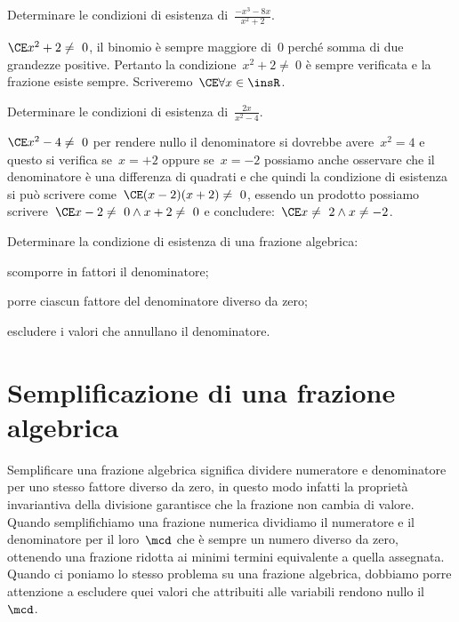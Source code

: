  \begin{esempio}
Determinare le condizioni di esistenza di~\(\frac{-x^{3}-8x}{x^{2}+2}\).

\(\CE x^{2}+2\neq~0\), il binomio è sempre maggiore di~\(0\) perché somma di due 
grandezze positive.
Pertanto la condizione~\(x^{2}+2\neq~0\) è sempre verificata e la frazione 
esiste sempre. Scriveremo~\(\CE \forall x\in \insR\).
 \end{esempio}

 \begin{esempio}
Determinare le condizioni di esistenza di~\(\frac{2x}{x^{2}-4}\).

\(\CE x^{2}-4\neq~0\) per rendere nullo il denominatore si dovrebbe 
avere~\(x^2 = 4\) e questo si verifica se~\(x = +2\)
oppure se~\(x = -2\) possiamo anche osservare che il denominatore è una 
differenza di quadrati e che quindi la
condizione di esistenza si può scrivere come~\(\CE (x-2)(x+2)\neq~0\), essendo 
un prodotto possiamo
scrivere~\(\CE x-2\neq~0\wedge x+2\neq~0\) e 
concludere:~\(\CE x\neq~2\wedge x\neq -2\).
 \end{esempio}

\begin{procedura}
Determinare la condizione di esistenza di una frazione algebrica:
\begin{enumeratea}
\item scomporre in fattori il denominatore;
\item porre ciascun fattore del denominatore diverso da zero;
\item escludere i valori che annullano il denominatore.
\end{enumeratea}
\end{procedura}


\section{Semplificazione di una frazione algebrica}
\label{sec:frazalg_semplificazione}

Semplificare una frazione algebrica significa dividere numeratore e 
denominatore per uno stesso fattore diverso da zero, in questo modo infatti la 
proprietà invariantiva della divisione garantisce che la frazione non cambia 
di valore.
Quando semplifichiamo una frazione numerica dividiamo il numeratore e il 
denominatore per il loro~\(\mcd\)
che è sempre un numero diverso da zero, ottenendo una frazione ridotta ai 
minimi termini equivalente a quella assegnata.
Quando ci poniamo lo stesso problema su una frazione algebrica, dobbiamo porre 
attenzione a escludere quei valori che attribuiti alle variabili rendono nullo 
il~\(\mcd\).

